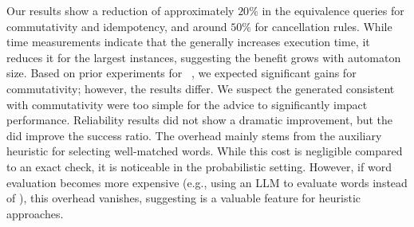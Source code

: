 Our results show a reduction of approximately $20\%$ in the equivalence queries for commutativity and idempotency,
and around $50\%$ for cancellation rules. 
While time measurements indicate that the \SRS generally increases execution time, it reduces it for the largest instances, suggesting the benefit grows with automaton size.
Based on prior experiments for \DFA~\cite{ecai25}, we expected significant gains for commutativity; however, the results differ.
We suspect the generated \DVPA consistent with commutativity were too simple for the advice to significantly impact performance.
Reliability results did not show a dramatic improvement, but the \SRS did improve the success ratio.
The overhead mainly stems from the auxiliary heuristic for selecting well-matched words. 
While this cost is negligible compared to an exact check, it is noticeable in the probabilistic setting. 
However, if word evaluation becomes more expensive (e.g., using an LLM to evaluate words instead of \DVPA), this overhead vanishes, suggesting \SRS is a valuable feature for heuristic approaches.
 
